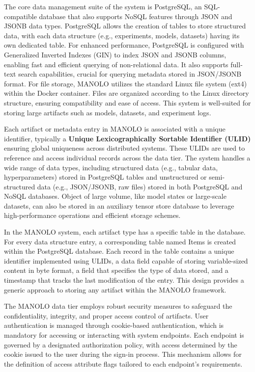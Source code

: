 The core data management suite of the system is PostgreSQL, an SQL-compatible database that also supports NoSQL features through JSON and JSONB data types. PostgreSQL allows the creation of tables to store structured data, with each data structure (e.g., experiments, models, datasets) having its own dedicated table. For enhanced performance, PostgreSQL is configured with Generalized Inverted Indexes (GIN) to index JSON and JSONB columns, enabling fast and efficient querying of non-relational data. It also supports full-text search capabilities, crucial for querying metadata stored in JSON/JSONB format.
For file storage, MANOLO utilizes the standard Linux file system (ext4) within the Docker container. Files are organized according to the Linux directory structure, ensuring compatibility and ease of access. This system is well-suited for storing large artifacts such as models, datasets, and experiment logs.

Each artifact or metadata entry in MANOLO is associated with a unique identifier, typically a \textbf{Unique Lexicographically Sortable Identifier (ULID)} ensuring global uniqueness across distributed systems. These ULIDs are used to reference and access individual records across the data tier. The system handles a wide range of data types, including structured data (e.g., tabular data, hyperparameters) stored in PostgreSQL tables and unstructured or semi-structured data (e.g., JSON/JSONB, raw files) stored in both PostgreSQL and NoSQL databases. Object of large volume, like model states or large-scale datasets, can also be stored in an auxiliary tensor store database to leverage high-performance operations and efficient storage schemes.

In the MANOLO system, each artifact type has a specific table in the database. For every data structure entry, a corresponding table named Items is created within the PostgreSQL database. Each record in the table contains a unique identifier implemented using ULIDs, a data field capable of storing variable-sized content in byte format, a field that specifies the type of data stored, and a timestamp that tracks the last modification of the entry. This design provides a generic approach to storing any artifact within the MANOLO framework.

The MANOLO data tier employs robust security measures to safeguard the confidentiality, integrity, and proper access control of artifacts. User authentication is managed through cookie-based authentication, which is mandatory for accessing or interacting with system endpoints. Each endpoint is governed by a designated authorization policy, with access determined by the cookie issued to the user during the sign-in process. This mechanism allows for the definition of access attribute flags tailored to each endpoint's requirements.

